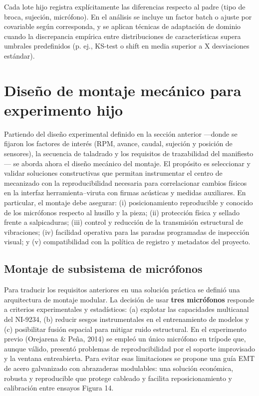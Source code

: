 \documentclass[12pt, letterpaper]{report}
\begin{document}
Cada lote hijo registra explícitamente las diferencias respecto al padre (tipo de broca, sujeción, micrófono). En el análisis se incluye un factor batch o ajuste por covariable según corresponda, y se aplican técnicas de adaptación de dominio cuando la discrepancia empírica entre distribuciones de características supera umbrales predefinidos (p. ej., KS-test o shift en media superior a X desviaciones estándar).

\section{Diseño de montaje mecánico para experimento hijo}

Partiendo del diseño experimental definido en la sección anterior ---donde se fijaron los factores de interés (RPM, avance, caudal, sujeción y posición de sensores), la secuencia de taladrado y los requisitos de trazabilidad del manifiesto--- se aborda ahora el diseño mecánico del montaje. El propósito es seleccionar y validar soluciones constructivas que permitan instrumentar el centro de mecanizado con la reproducibilidad necesaria para correlacionar cambios físicos en la interfaz herramienta--viruta con firmas acústicas y medidas auxiliares. En particular, el montaje debe asegurar: (i) posicionamiento reproducible y conocido de los micrófonos respecto al husillo y la pieza; (ii) protección física y sellado frente a salpicaduras; (iii) control y reducción de la transmisión estructural de vibraciones; (iv) facilidad operativa para las paradas programadas de inspección visual; y (v) compatibilidad con la política de registro y metadatos del proyecto.

\subsection{Montaje de subsistema de micrófonos}

Para traducir los requisitos anteriores en una solución práctica se definió una arquitectura de montaje modular. La decisión de usar \textbf{tres micrófonos} responde a criterios experimentales y estadísticos: (a) explotar las capacidades multicanal del NI-9234, (b) reducir sesgos instrumentales en el entrenamiento de modelos y (c) posibilitar fusión espacial para mitigar ruido estructural. En el experimento previo (Orejarena \& Peña, 2014) se empleó un único micrófono en trípode que, aunque válido, presentó problemas de reproducibilidad por el soporte improvisado y la ventana entreabierta. Para evitar esas limitaciones se propone una guía EMT de acero galvanizado con abrazaderas modulables: una solución económica, robusta y reproducible que protege cableado y facilita reposicionamiento y calibración entre ensayos Figura 14.
\end{document}
